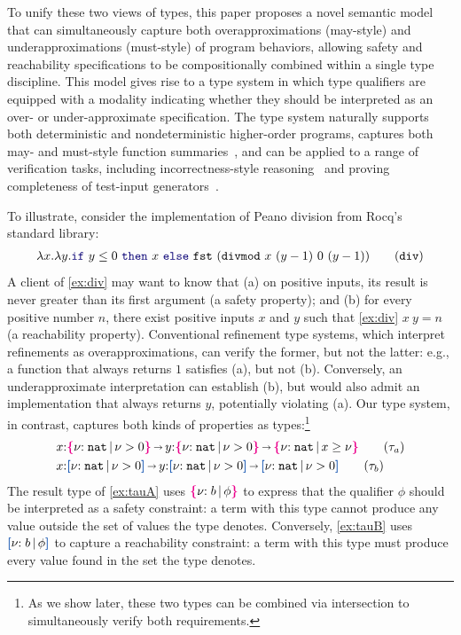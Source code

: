 To unify these two views of types, this paper proposes a novel
semantic model that can simultaneously capture both overapproximations
(may-style) and underapproximations (must-style) of program behaviors,
allowing safety and reachability specifications to be compositionally
combined within a single type discipline. This model gives rise to a
type system in which type qualifiers are equipped with a modality
indicating whether they should be interpreted as an over- or
under-approximate specification.  The type system naturally supports
both deterministic and nondeterministic higher-order programs, captures
both may- and must-style function summaries~\cite{GN+10}, and can be
applied to a range of verification tasks, including
incorrectness-style reasoning~\cite{OHP19} and proving completeness of
test-input generators~\cite{CoverageType}.

To illustrate, consider the implementation of Peano division from
Rocq's standard library:
\vspace{-0.2em}
\begin{align}
  \lambda x.\lambda y. \zif{y \leq 0}{x}{\Code{fst~(divmod}~x~(y - 1)~0~(y - 1))}
  \tag{\Code{div}}\label{ex:div}
\end{align}
A client of \ref{ex:div} may want to know that (a) on positive
inputs, its result is never greater than its first argument (a safety
property); and (b) for every positive number $n$, there exist positive
inputs $x$ and $y$ such that \ref{ex:div} $x~ y = n$ (a reachability
property). Conventional refinement type systems, which interpret
refinements as overapproximations, can verify the former, but not the
latter: e.g., a function that always returns $1$ satisfies
(a), but not (b). Conversely, an underapproximate interpretation can establish (b),
but would also admit an implementation that always returns $y$, potentially violating (a). Our
type system, in contrast, captures both kinds of properties as types:\footnote{As we show later,
  these two types can be combined via intersection to simultaneously verify both
  requirements.}
\vspace{-0.2em}
\begin{align}
  & x{:}\ort{\Nat}{\vnu > 0} \sarr y{:}\ort{\Nat}{\vnu > 0 } \sarr \ort{\Nat}{x \geq \vnu} \tag{$\tau_a$}\label{ex:tauA}\\
  & x{:}\urt{\Nat}{\vnu > 0} \sarr y{:}\urt{\Nat}{\vnu > 0} \sarr \urt{\Nat}{\vnu > 0 } \tag{$\tau_b$}\label{ex:tauB}
\end{align}\noindent
The result type of \ref{ex:tauA} uses $\textcolor{magenta}{\mbox{\rm\textbf{\{}}} { {\nu}{:}\;{b}\, |\, {\phi} } \textcolor{magenta}{\mbox{\rm\textbf{\}}}}$ to express that
the qualifier $\phi$ should be interpreted as a safety constraint: a
term with this type cannot produce any value outside the set of values
the type denotes.  Conversely, \ref{ex:tauB} uses $\urt{b}{\phi}$ to
capture a reachability constraint: a term with this type must produce
every value found in the set the type denotes.

